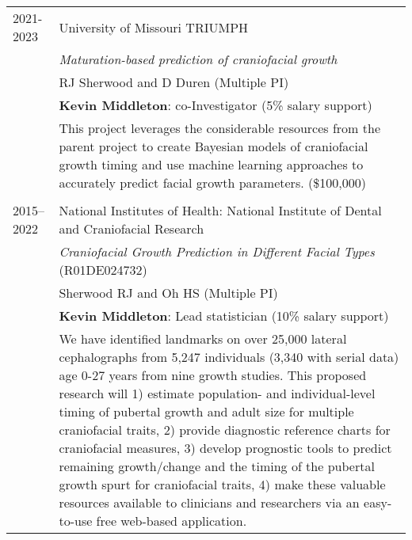 \begin{longtable}{@{}lX@{}}
    2021-2023 & University of Missouri TRIUMPH\\
    & \emph{Maturation-based prediction of craniofacial growth}\\
    & RJ Sherwood and D Duren (Multiple PI)\\
    & \textbf{Kevin Middleton}: co-Investigator (5\% salary support)\\[0.5pc]
    & This project leverages the considerable resources from the parent project to create Bayesian models of craniofacial growth timing and use machine learning approaches to accurately predict facial growth parameters. (\$100,000)\\
    \\
    2015--2022 & National Institutes of Health: National Institute of Dental and Craniofacial Research\\
    & \emph{Craniofacial Growth Prediction in Different Facial Types} (R01DE024732)\\
    & Sherwood RJ and Oh HS (Multiple PI)\\
    & \textbf{Kevin Middleton}: Lead statistician (10\% salary support)\\[0.5pc]
    & We have identified landmarks on over 25,000 lateral cephalographs from 5,247 individuals (3,340 with serial data) age 0-27 years from nine growth studies. This proposed research will 1) estimate population- and individual-level timing of pubertal growth and adult size for multiple craniofacial traits, 2) provide diagnostic reference charts for craniofacial measures, 3) develop prognostic tools to predict remaining growth/change and the timing of the pubertal growth spurt for craniofacial traits, 4) make these valuable resources available to clinicians and researchers via an easy-to-use free web-based application.\\

\end{longtable}
